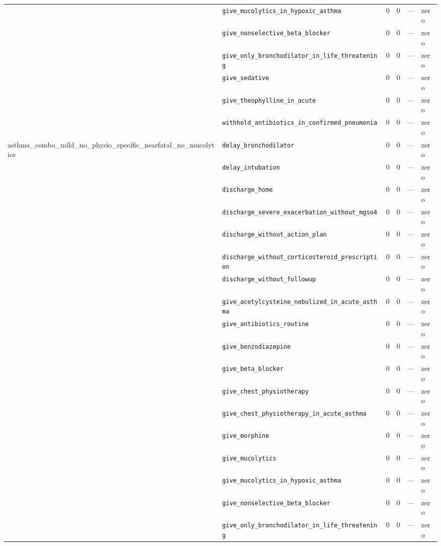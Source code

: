 \begin{table}[ht]
\begin{tabular}{llrrrl}
 & \texttt{give\_mucolytics\_in\_hypoxic\_asthma} & 0 & 0 & — & zero \\
 & \texttt{give\_nonselective\_beta\_blocker} & 0 & 0 & — & zero \\
 & \texttt{give\_only\_bronchodilator\_in\_life\_threatening} & 0 & 0 & — & zero \\
 & \texttt{give\_sedative} & 0 & 0 & — & zero \\
 & \texttt{give\_theophylline\_in\_acute} & 0 & 0 & — & zero \\
 & \texttt{withhold\_antibiotics\_in\_confirmed\_pneumonia} & 0 & 0 & — & zero \\
\midrule
asthma\_combo\_mild\_no\_physio\_specific\_nearfatal\_no\_mucolytics & \texttt{delay\_bronchodilator} & 0 & 0 & — & zero \\
 & \texttt{delay\_intubation} & 0 & 0 & — & zero \\
 & \texttt{discharge\_home} & 0 & 0 & — & zero \\
 & \texttt{discharge\_severe\_exacerbation\_without\_mgso4} & 0 & 0 & — & zero \\
 & \texttt{discharge\_without\_action\_plan} & 0 & 0 & — & zero \\
 & \texttt{discharge\_without\_corticosteroid\_prescription} & 0 & 0 & — & zero \\
 & \texttt{discharge\_without\_followup} & 0 & 0 & — & zero \\
 & \texttt{give\_acetylcysteine\_nebulized\_in\_acute\_asthma} & 0 & 0 & — & zero \\
 & \texttt{give\_antibiotics\_routine} & 0 & 0 & — & zero \\
 & \texttt{give\_benzodiazepine} & 0 & 0 & — & zero \\
 & \texttt{give\_beta\_blocker} & 0 & 0 & — & zero \\
 & \texttt{give\_chest\_physiotherapy} & 0 & 0 & — & zero \\
 & \texttt{give\_chest\_physiotherapy\_in\_acute\_asthma} & 0 & 0 & — & zero \\
 & \texttt{give\_morphine} & 0 & 0 & — & zero \\
 & \texttt{give\_mucolytics} & 0 & 0 & — & zero \\
 & \texttt{give\_mucolytics\_in\_hypoxic\_asthma} & 0 & 0 & — & zero \\
 & \texttt{give\_nonselective\_beta\_blocker} & 0 & 0 & — & zero \\
 & \texttt{give\_only\_bronchodilator\_in\_life\_threatening} & 0 & 0 & — & zero \\

\end{tabular}
\end{table}
